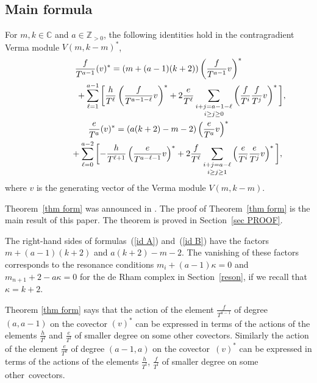\subsection{Main formula}
\begin{thm}[{\cite[Theorem 5.12]{SV2}}]\label{thm form}
For $m, k\in{\mathbb C}$ and $a\in{\mathbb Z}_{>0}$, the following identities hold in the contragradient Verma module $V(m,k-m)^*$,
\begin{gather}
\frac{f}{T^{a-1}} (v)^* = (m+(a-1)(k+2))\left(\frac{f}{T^{a-1}}v\right)^* \nonumber \\
\hphantom{\frac{f}{T^{a-1}} (v)^* =} + \sum_{\ell=1}^{a-1}\bigg[\frac{h}{T^\ell}\left(\frac{f}{T^{a-1-\ell}}v\right)^* + 2 \frac{e}{T^\ell}\mathop{\sum_{i+j=a-1-\ell}}_{i\geq j\geq 0} \left(\frac{f}{T^i}\frac{f}{T^j}v\right)^*\bigg], \label{id A}\\
\frac{e}{T^a} (v)^*=(a(k+2)-m-2) \left(\frac{e}{T^a}v\right)^* \nonumber\\
\hphantom{\frac{e}{T^a} (v)^*=} + \sum_{\ell=0}^{a-2}\bigg[{-} \frac{h}{T^{\ell+1}} \left(\frac{e}{T^{a-\ell-1}}v\right)^* + 2 \frac{f}{T^\ell}\mathop{\sum_{i+j=a-\ell}}_{i\geq j\geq 1} \left(\frac{e}{T^i}\frac{e}{T^j}v\right)^*\bigg],\label{id B}
\end{gather}
where $v$ is the generating vector of the Verma module $V(m,k-m)$.
\end{thm}

Theorem~\ref{thm form} was announced in \cite{SV2}. The proof of Theorem~\ref{thm form} is the main result of this paper. The theorem is proved in Section~\ref{sec PROOF}.

\begin{rem} The right-hand sides of formulas~(\ref{id A}) and~(\ref{id B}) have the factors $m+(a-1)(k+2)$ and $a(k+2)-m-2$. The vanishing of these factors corresponds to the resonance conditions $m_i+(a-1)\kappa=0$ and $m_{n+1}+2-a\kappa=0$ for the de Rham complex in Section~\ref{reson}, if we recall that $\kappa=k+2$.
\end{rem}

\begin{rem}Theorem \ref{thm form} says that the action of the element $\frac{f}{T^{a-1}}$ of degree $(a,a-1)$ on the covector $(v)^*$ can be expressed in terms of the actions of the elements $\frac{h}{T^{l}}$ and $\frac{e}{T^{l}}$ of smaller degree on some other covectors. Similarly the action of the element $\frac{e}{T^{a}}$ of degree $(a-1,a)$ on the covector~$(v)^*$ can be expressed in terms of the actions of the elements $\frac{h}{T^{l}}$, $\frac{f}{T^{l}}$ of smaller degree on some other~covectors.
\end{rem}

